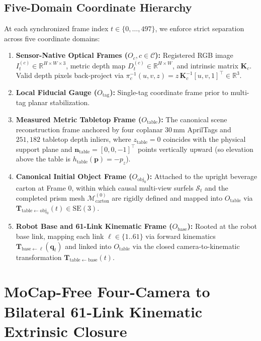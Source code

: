 \documentclass[10pt,journal]{IEEEtran}
\begin{document}
\subsection{Five-Domain Coordinate Hierarchy}
At each synchronized frame index $t \in \{0, \dots, 497\}$, we enforce strict separation across five coordinate domains:
\begin{enumerate}
    \item \textbf{Sensor-Native Optical Frames ($O_c, c \in \mathcal{C}$):} Registered RGB image $I_t^{(c)} \in \mathbb{R}^{H\times W\times 3}$, metric depth map $D_t^{(c)} \in \mathbb{R}^{H\times W}$, and intrinsic matrix $\mathbf{K}_c$. Valid depth pixels back-project via $\pi_c^{-1}(u,v,z) = z\,\mathbf{K}_c^{-1}[u, v, 1]^\top \in \mathbb{R}^3$.
    \item \textbf{Local Fiducial Gauge ($O_{\mathrm{tag}}$):} Single-tag coordinate frame prior to multi-tag planar stabilization.
    \item \textbf{Measured Metric Tabletop Frame ($O_{\mathrm{table}}$):} The canonical scene reconstruction frame anchored by four coplanar $30\,\mathrm{mm}$ AprilTags and $251{,}182$ tabletop depth inliers, where $z_{\mathrm{table}} = 0$ coincides with the physical support plane and $\mathbf{n}_{\mathrm{table}} = [0, 0, -1]^\top$ points vertically upward (so elevation above the table is $h_{\mathrm{table}}(\mathbf{p}) = -p_z$).
    \item \textbf{Canonical Initial Object Frame ($O_{\mathrm{obj}_0}$):} Attached to the upright beverage carton at Frame 0, within which causal multi-view surfels $\mathcal{S}_t$ and the completed prism mesh $\mathcal{M}_{\mathrm{carton}}^{(0)}$ are rigidly defined and mapped into $O_{\mathrm{table}}$ via $\mathbf{T}_{\mathrm{table}\leftarrow \mathrm{obj}_0}(t) \in \mathrm{SE}(3)$.
    \item \textbf{Robot Base and 61-Link Kinematic Frame ($O_{\mathrm{base}}$):} Rooted at the robot base link, mapping each link $\ell \in \{1..61\}$ via forward kinematics $\mathbf{T}_{\mathrm{base}\leftarrow \ell}(\mathbf{q}_t)$ and linked into $O_{\mathrm{table}}$ via the closed camera-to-kinematic transformation $\mathbf{T}_{\mathrm{table}\leftarrow \mathrm{base}}(t)$.
\end{enumerate}

\section{MoCap-Free Four-Camera to Bilateral 61-Link Kinematic Extrinsic Closure}
\label{sec:closure}
\end{document}
